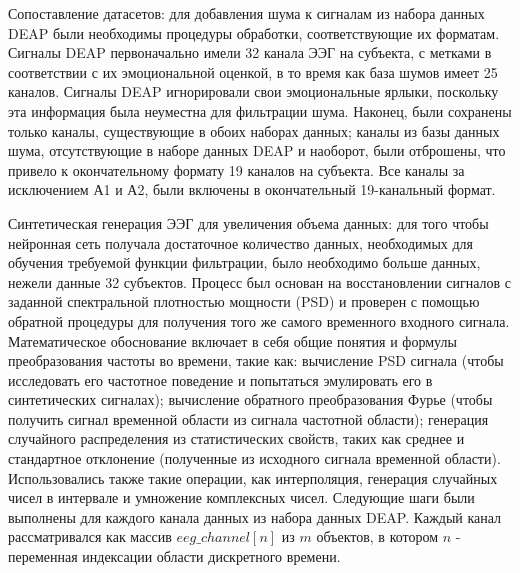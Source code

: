 \documentclass[12pt, a4paper, titlepage]{extreport}
\begin{document}
	Сопоставление датасетов: для добавления шума к сигналам из набора данных DEAP были необходимы процедуры обработки, соответствующие их форматам. Сигналы DEAP первоначально имели 32 канала ЭЭГ на субъекта, с метками в соответствии с их эмоциональной оценкой, в то время как база шумов имеет 25 каналов. Сигналы DEAP игнорировали свои эмоциональные ярлыки, поскольку эта информация была неуместна для фильтрации шума. Наконец, были сохранены только каналы, существующие в обоих наборах данных; каналы из базы данных шума, отсутствующие в наборе данных DEAP и наоборот, были отброшены, что привело к окончательному формату 19 каналов на субъекта. Все каналы за исключением А1 и А2, были включены в окончательный 19-канальный формат.
	
	Синтетическая генерация ЭЭГ для увеличения объема данных: для того чтобы нейронная сеть получала достаточное количество данных, необходимых для обучения требуемой функции фильтрации, было необходимо больше данных, нежели данные 32 субъектов. Процесс был основан на восстановлении сигналов с заданной спектральной плотностью мощности (PSD) и проверен с помощью обратной процедуры для получения того же самого временного входного сигнала.
	Математическое обоснование включает в себя общие понятия и формулы преобразования частоты во времени, такие как: вычисление PSD сигнала (чтобы исследовать его частотное поведение и попытаться эмулировать его в синтетических сигналах); вычисление обратного преобразования Фурье (чтобы получить сигнал временной области из сигнала частотной области); генерация случайного распределения из статистических свойств, таких как среднее и стандартное отклонение (полученные из исходного сигнала временной области). Использовались также такие операции, как интерполяция, генерация случайных чисел в интервале и умножение комплексных чисел.
	Следующие шаги были выполнены для каждого канала данных из набора данных DEAP. Каждый канал рассматривался как массив $eeg\_channel[n]$ из $m$ объектов, в котором $n$ - переменная индексации области дискретного времени.
\end{document}
